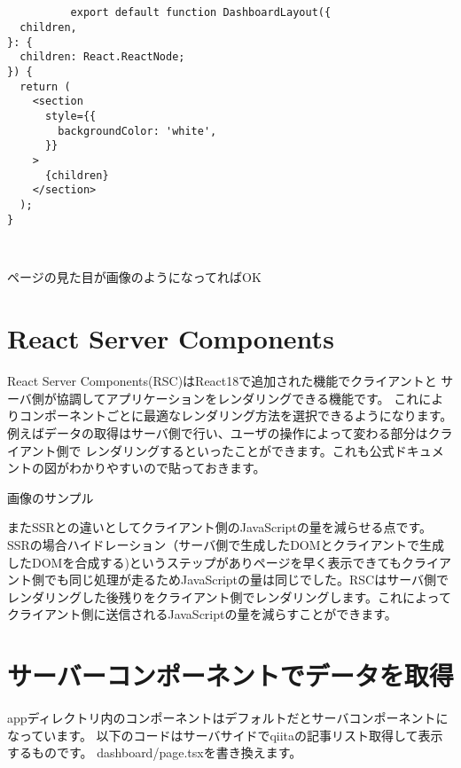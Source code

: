 \begin{tcolorbox}[breakable]
  \begin{verbatim}


          export default function DashboardLayout({
  children,
}: {
  children: React.ReactNode;
}) {
  return (
    <section
      style={{
        backgroundColor: 'white',            
      }}
    >
      {children}
    </section>
  );
}
      
      
        \end{verbatim}
\end{tcolorbox}


ページの見た目が画像のようになってればOK









\section{React Server Components}
React Server Components(RSC)はReact18で追加された機能でクライアントと
サーバ側が協調してアプリケーションをレンダリングできる機能です。
これによりコンポーネントごとに最適なレンダリング方法を選択できるようになります。
例えばデータの取得はサーバ側で行い、ユーザの操作によって変わる部分はクライアント側で
レンダリングするといったことができます。これも公式ドキュメントの図がわかりやすいので貼っておきます。


画像のサンプル



またSSRとの違いとしてクライアント側のJavaScriptの量を減らせる点です。
SSRの場合ハイドレーション（サーバ側で生成したDOMとクライアントで生成したDOMを合成する)というステップがありページを早く表示できてもクライアント側でも同じ処理が走るためJavaScriptの量は同じでした。RSCはサーバ側でレンダリングした後残りをクライアント側でレンダリングします。これによってクライアント側に送信されるJavaScriptの量を減らすことができます。


\section{サーバーコンポーネントでデータを取得}


appディレクトリ内のコンポーネントはデフォルトだとサーバコンポーネントになっています。
以下のコードはサーバサイドでqiitaの記事リスト取得して表示するものです。
dashboard/page.tsxを書き換えます。




